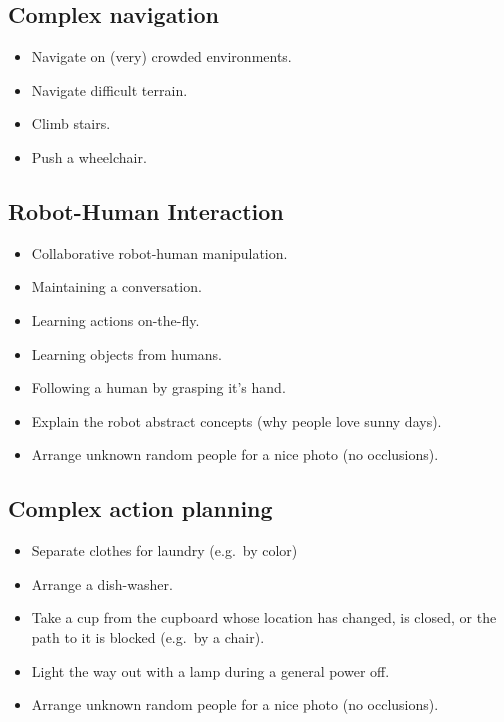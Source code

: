 \subsection{Complex navigation}
\begin{itemize}
	\item Navigate on (very) crowded environments.
	\item Navigate difficult terrain.
	\item Climb stairs.
	\item Push a wheelchair.
\end{itemize}

\subsection{Robot-Human Interaction}
\begin{itemize}
	\item Collaborative robot-human manipulation.
	\item Maintaining a conversation.
	\item Learning actions on-the-fly.
	\item Learning objects from humans.
	\item Following a human by grasping it's hand.
	\item Explain the robot abstract concepts (why people love sunny days).
	\item Arrange unknown random people for a nice photo (no occlusions).
\end{itemize}

\subsection{Complex action planning} 
\begin{itemize}
	\item Separate clothes for laundry (e.g.~by color)
	\item Arrange a dish-washer.
	\item Take a cup from the cupboard whose location has changed, is closed, or the path to it is blocked (e.g.~by a chair).
	\item Light the way out with a lamp during a general power off.
	\item Arrange unknown random people for a nice photo (no occlusions).
\end{itemize}
